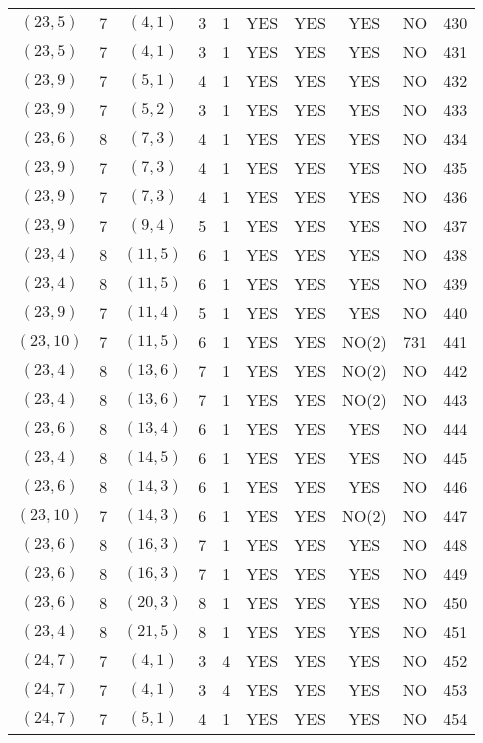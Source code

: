 \begin{longtable}{|c|c|c|c|c|c|c|c|c|c|}
$(23, 5)$ & 7 & $(4, 1)$ & 3 & 1 & YES & YES & YES & NO & 430\\
$(23, 5)$ & 7 & $(4, 1)$ & 3 & 1 & YES & YES & YES & NO & 431\\
$(23, 9)$ & 7 & $(5, 1)$ & 4 & 1 & YES & YES & YES & NO & 432\\
$(23, 9)$ & 7 & $(5, 2)$ & 3 & 1 & YES & YES & YES & NO & 433\\
$(23, 6)$ & 8 & $(7, 3)$ & 4 & 1 & YES & YES & YES & NO & 434\\
$(23, 9)$ & 7 & $(7, 3)$ & 4 & 1 & YES & YES & YES & NO & 435\\
$(23, 9)$ & 7 & $(7, 3)$ & 4 & 1 & YES & YES & YES & NO & 436\\
$(23, 9)$ & 7 & $(9, 4)$ & 5 & 1 & YES & YES & YES & NO & 437\\
$(23, 4)$ & 8 & $(11, 5)$ & 6 & 1 & YES & YES & YES & NO & 438\\
$(23, 4)$ & 8 & $(11, 5)$ & 6 & 1 & YES & YES & YES & NO & 439\\
$(23, 9)$ & 7 & $(11, 4)$ & 5 & 1 & YES & YES & YES & NO & 440\\
$(23, 10)$ & 7 & $(11, 5)$ & 6 & 1 & YES & YES & NO(2) & 731 & 441\\
$(23, 4)$ & 8 & $(13, 6)$ & 7 & 1 & YES & YES & NO(2) & NO & 442\\
$(23, 4)$ & 8 & $(13, 6)$ & 7 & 1 & YES & YES & NO(2) & NO & 443\\
$(23, 6)$ & 8 & $(13, 4)$ & 6 & 1 & YES & YES & YES & NO & 444\\
$(23, 4)$ & 8 & $(14, 5)$ & 6 & 1 & YES & YES & YES & NO & 445\\
$(23, 6)$ & 8 & $(14, 3)$ & 6 & 1 & YES & YES & YES & NO & 446\\
$(23, 10)$ & 7 & $(14, 3)$ & 6 & 1 & YES & YES & NO(2) & NO & 447\\
$(23, 6)$ & 8 & $(16, 3)$ & 7 & 1 & YES & YES & YES & NO & 448\\
$(23, 6)$ & 8 & $(16, 3)$ & 7 & 1 & YES & YES & YES & NO & 449\\
$(23, 6)$ & 8 & $(20, 3)$ & 8 & 1 & YES & YES & YES & NO & 450\\
$(23, 4)$ & 8 & $(21, 5)$ & 8 & 1 & YES & YES & YES & NO & 451\\
$(24, 7)$ & 7 & $(4, 1)$ & 3 & 4 & YES & YES & YES & NO & 452\\
$(24, 7)$ & 7 & $(4, 1)$ & 3 & 4 & YES & YES & YES & NO & 453\\
$(24, 7)$ & 7 & $(5, 1)$ & 4 & 1 & YES & YES & YES & NO & 454\\

\end{longtable}
